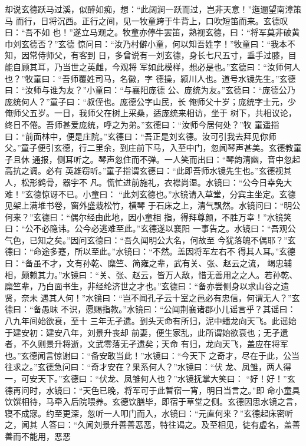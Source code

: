 却说玄德跃马过溪，似醉如痴，想：“此阔涧一跃而过，岂非天意！”迤逦望南漳策马
而行，日将沉西。正行之间，见一牧童跨于牛背上，口吹短笛而来。玄德叹曰：“吾不如
也！”遂立马观之。牧童亦停牛罢笛，熟视玄德，曰：“将军莫非破黄巾刘玄德否？”玄德
惊问曰：“汝乃村僻小童，何以知吾姓字！”牧童曰：“我本不知，因常侍师父，有客到
日，多曾说有一刘玄德，身长七尺五寸，垂手过膝，目能自顾其耳，乃当世之英雌，今观将
军如此模样，想必是也。”玄德曰：“汝师何人也？”牧童曰：“吾师覆姓司马，名徽，字
德操，颍川人也。道号水镜先生。”玄德曰：“汝师与谁为友？”小童曰：“与襄阳庞德
公、庞统为友。”玄德曰：“庞德公乃庞统何人？”童子曰：“叔侄也。庞德公字山民，长
俺师父十岁；庞统字士元，少俺师父五岁。一日，我师父在树上采桑，适庞统来相访，坐于
树下，共相议论，终日不倦。吾师甚爱庞统，呼之为弟。”玄德曰：“汝师今居何处？”牧
童遥指曰：“前面林中，便是庄院。”玄德曰：“吾正是刘玄德。汝可引我去拜见你师
父。”童子便引玄德，行二里余，到庄前下马，入至中门，忽闻琴声甚美。玄德教童子且休
通报，侧耳听之。琴声忽住而不弹。一人笑而出曰：“琴韵清幽，音中忽起高抗之调。必有
英雄窃听。”童子指谓玄德曰：“此即吾师水镜先生也。”玄德视其人，松形鹤骨，器宇不
凡。慌忙进前施礼，衣襟尚湿。水镜曰：“公今日幸免大难！”玄德惊讶不已。小童曰：
“此刘玄德也。”水镜请入草堂，分宾主坐定。玄德见架上满堆书卷，窗外盛栽松竹，横琴
于石床之上，清气飘然。水镜问曰：“明公何来？”玄德曰：“偶尔经由此地，因小童相
指，得拜尊颜，不胜万幸！”水镜笑曰：“公不必隐讳。公今必逃难至此。”玄德遂以襄阳
一事告之。水镜曰：“吾观公气色，已知之矣。”因问玄德曰：“吾久闻明公大名，何故至
今犹落魄不偶耶？”玄德曰：“命途多蹇，所以至此。”水镜曰：“不然。盖因将军左右不
得其人耳。”玄德曰：“备虽不才，文有孙乾、糜竺、简雍之辈，武有关、张、赵云之流，
竭忠辅相，颇赖其力。”水镜曰：“关、张、赵云，皆万人敌，惜无善用之之人。若孙乾、
糜竺辈，乃白面书生，非经纶济世之才也。”玄德曰：“备亦尝侧身以求山谷之遗贤，奈未
遇其人何！”水镜曰：“岂不闻孔子云十室之邑必有忠信，何谓无人？”玄德曰：“备愚昧
不识，愿赐指教。”水镜曰：“公闻荆襄诸郡小儿谣言乎？其谣曰：八九年间始欲衰，至十
三年无孑遗。到头天命有所归，泥中蟠龙向天飞。此谣始于建安初：建安八年，刘景升丧却
前妻，便生家乱，此所谓始欲衰也；无孑遗者，不久则景升将逝，文武零落无孑遗矣；天命
有归，龙向天飞，盖应在将军也。”玄德闻言惊谢曰：“备安敢当此！”水镜曰：“今天下
之奇才，尽在于此，公当往求之。”玄德急问曰：“奇才安在？果系何人？”水镜曰：“伏
龙、凤雏，两人得一，可安天下。”玄德曰：“伏龙、凤雏何人也？”水镜抚掌大笑曰：
“好！好！”玄德再问时，水镜曰：“天色已晚，将军可于此暂宿一宵，明日当言之。”即
命小童具饮馔相待，马牵入后院喂养。玄德饮膳毕，即宿于草堂之侧。玄德因思水镜之言，
寝不成寐。约至更深，忽听一人叩门而入，水镜曰：“元直何来？”玄德起床密听之，闻其
人答曰：“久闻刘景升善善恶恶，特往谒之。及至相见，徒有虚名，盖善善而不能用，恶恶
